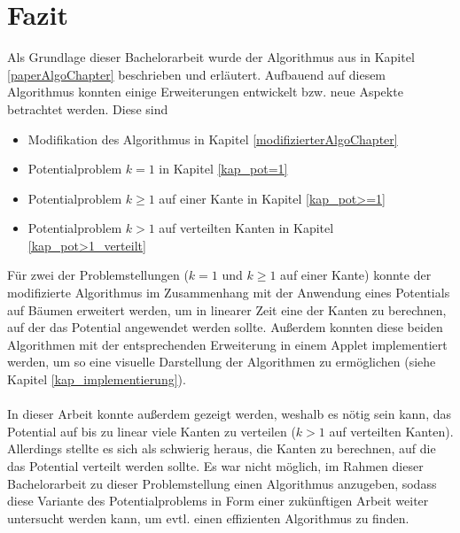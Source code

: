 \section{Fazit}

Als Grundlage dieser Bachelorarbeit wurde der Algorithmus aus \cite{cima_paper} in Kapitel \ref{paperAlgoChapter} beschrieben und erläutert. Aufbauend auf diesem Algorithmus konnten einige Erweiterungen entwickelt bzw. neue Aspekte betrachtet werden. Diese sind
\begin{itemize}
	\item Modifikation des Algorithmus in Kapitel \ref{modifizierterAlgoChapter}
	\item Potentialproblem $k = 1$ in Kapitel \ref{kap_pot=1}
	\item Potentialproblem $k \geq 1$ auf einer Kante in Kapitel \ref{kap_pot>=1}
	\item Potentialproblem $k > 1$ auf verteilten Kanten in Kapitel \ref{kap_pot>1_verteilt}
\end{itemize}

Für zwei der Problemstellungen ($k = 1$ und $k \geq 1$ auf einer Kante)  konnte der modifizierte Algorithmus im Zusammenhang mit der Anwendung eines Potentials auf Bäumen erweitert werden, um in linearer Zeit eine der Kanten zu berechnen, auf der das Potential angewendet werden sollte. Außerdem konnten diese beiden Algorithmen mit der entsprechenden Erweiterung in einem Applet implementiert werden, um so eine visuelle Darstellung der Algorithmen zu ermöglichen (siehe Kapitel \ref{kap_implementierung}). 
\\
\\
In dieser Arbeit konnte außerdem gezeigt werden, weshalb es nötig sein kann, das Potential auf bis zu linear viele Kanten zu verteilen ($k > 1$ auf verteilten Kanten). Allerdings stellte es sich als schwierig heraus, die Kanten zu berechnen, auf die das Potential verteilt werden sollte. Es war nicht möglich, im Rahmen dieser Bachelorarbeit zu dieser Problemstellung einen Algorithmus anzugeben, sodass diese Variante des Potentialproblems in Form einer zukünftigen Arbeit weiter untersucht werden kann, um evtl. einen effizienten Algorithmus zu finden.
